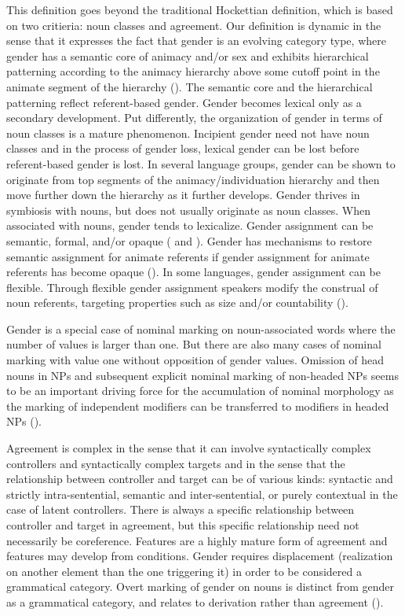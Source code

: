 \documentclass[output=collectionpaper]{langsci/langscibook}
\begin{document}
This definition goes beyond the traditional Hockettian definition, which is based on two critieria: noun classes and agreement. Our definition is dynamic in the sense that it expresses the fact that gender is an evolving category type, where gender has a semantic core of animacy and/or sex and exhibits hierarchical patterning according to the animacy hierarchy above some cutoff point in the animate segment of the hierarchy (). The semantic core and the hierarchical patterning reflect referent-based gender. Gender becomes lexical only as a secondary development. Put differently, the organization of gender in terms of noun classes is a mature phenomenon. Incipient gender need not have noun classes and in the process of gender loss, lexical gender can be lost before referent-based gender is lost. In several language groups, gender can be shown to originate from top segments of the animacy/individuation hierarchy and then move further down the hierarchy as it further develops. Gender thrives in symbiosis with nouns, but does not usually originate as noun classes. When associated with nouns, gender tends to lexicalize. Gender assignment can be semantic, formal, and/or opaque ( and ). Gender has mechanisms to restore semantic assignment for animate referents if gender assignment for animate referents has become opaque (). In some languages, gender assignment can be flexible. Through flexible gender assignment speakers modify the construal of noun referents, targeting properties such as size and/or countability ().

Gender is a special case of nominal marking on noun-associated words where the number of values is larger than one. But there are also many cases of nominal marking with value one without opposition of gender values. Omission of head nouns in NPs and subsequent explicit nominal marking of non-headed NPs seems to be an important driving force for the accumulation of nominal morphology as the marking of independent modifiers can be transferred to modifiers in headed NPs ().

Agreement is complex in the sense that it can involve syntactically complex controllers and syntactically complex targets and in the sense that the relationship between controller and target can be of various kinds: syntactic and strictly intra-sentential, semantic and inter-sentential, or purely contextual in the case of latent controllers. There is always a specific relationship between controller and target in agreement, but this specific relationship need not necessarily be coreference. Features are a highly mature form of agreement and features may develop from conditions. Gender requires displacement (realization on another element than the one triggering it) in order to be considered a grammatical category. Overt marking of gender on nouns is distinct from gender as a grammatical category, and relates to derivation rather than agreement ().
\end{document}
